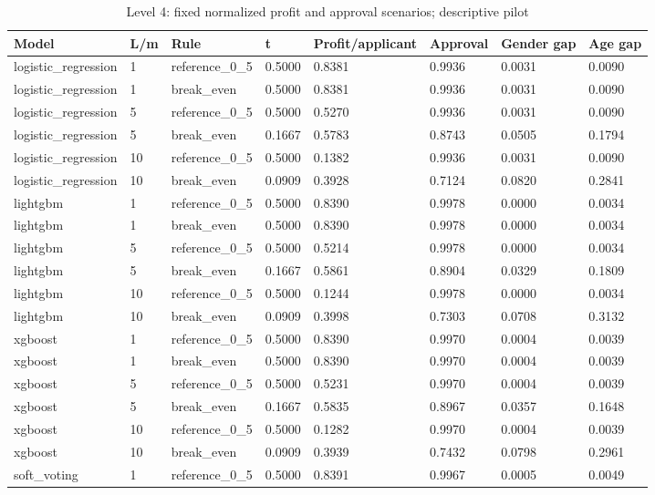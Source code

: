 \begin{longtable}{llllllll}
\caption{Level 4: fixed normalized profit and approval scenarios; descriptive pilot}\\
\toprule
Model & L/m & Rule & t & Profit/applicant & Approval & Gender gap & Age gap \\
\midrule
\endhead
logistic\_regression & 1 & reference\_0\_5 & 0.5000 & 0.8381 & 0.9936 & 0.0031 & 0.0090 \\
logistic\_regression & 1 & break\_even & 0.5000 & 0.8381 & 0.9936 & 0.0031 & 0.0090 \\
logistic\_regression & 5 & reference\_0\_5 & 0.5000 & 0.5270 & 0.9936 & 0.0031 & 0.0090 \\
logistic\_regression & 5 & break\_even & 0.1667 & 0.5783 & 0.8743 & 0.0505 & 0.1794 \\
logistic\_regression & 10 & reference\_0\_5 & 0.5000 & 0.1382 & 0.9936 & 0.0031 & 0.0090 \\
logistic\_regression & 10 & break\_even & 0.0909 & 0.3928 & 0.7124 & 0.0820 & 0.2841 \\
lightgbm & 1 & reference\_0\_5 & 0.5000 & 0.8390 & 0.9978 & 0.0000 & 0.0034 \\
lightgbm & 1 & break\_even & 0.5000 & 0.8390 & 0.9978 & 0.0000 & 0.0034 \\
lightgbm & 5 & reference\_0\_5 & 0.5000 & 0.5214 & 0.9978 & 0.0000 & 0.0034 \\
lightgbm & 5 & break\_even & 0.1667 & 0.5861 & 0.8904 & 0.0329 & 0.1809 \\
lightgbm & 10 & reference\_0\_5 & 0.5000 & 0.1244 & 0.9978 & 0.0000 & 0.0034 \\
lightgbm & 10 & break\_even & 0.0909 & 0.3998 & 0.7303 & 0.0708 & 0.3132 \\
xgboost & 1 & reference\_0\_5 & 0.5000 & 0.8390 & 0.9970 & 0.0004 & 0.0039 \\
xgboost & 1 & break\_even & 0.5000 & 0.8390 & 0.9970 & 0.0004 & 0.0039 \\
xgboost & 5 & reference\_0\_5 & 0.5000 & 0.5231 & 0.9970 & 0.0004 & 0.0039 \\
xgboost & 5 & break\_even & 0.1667 & 0.5835 & 0.8967 & 0.0357 & 0.1648 \\
xgboost & 10 & reference\_0\_5 & 0.5000 & 0.1282 & 0.9970 & 0.0004 & 0.0039 \\
xgboost & 10 & break\_even & 0.0909 & 0.3939 & 0.7432 & 0.0798 & 0.2961 \\
soft\_voting & 1 & reference\_0\_5 & 0.5000 & 0.8391 & 0.9967 & 0.0005 & 0.0049 \\

\end{longtable}
